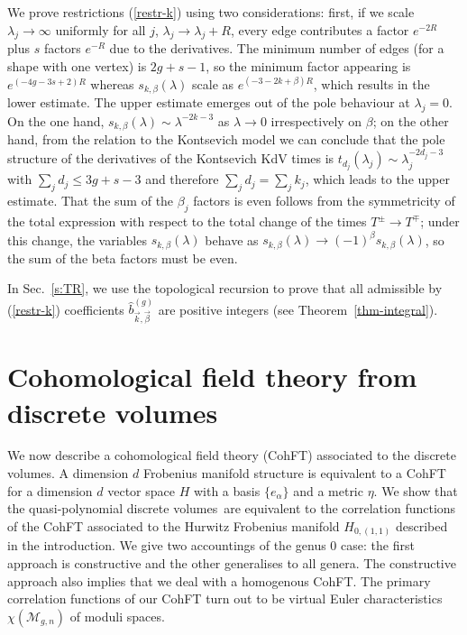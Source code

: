 \documentclass[11pt]{article}
\newcommand{\modm}{\mathcal{M}}
\theoremstyle{plain}
\theoremstyle{definition}
\newcommand {\dvol}{discrete volumes}%
\begin{document}
We prove restrictions (\ref{restr-k}) using two considerations: first, if we scale $\lambda_j\to \infty$ uniformly for
all $j$, $\lambda_j\to \lambda_j+R$, every edge contributes a factor $e^{-2R}$ plus $s$ factors
$e^{-R}$ due to the derivatives. The minimum number of edges (for a shape with one vertex) is $2g+s-1$, so the minimum
factor appearing is $e^{(-4g-3s+2)R}$ whereas $s_{k,\beta}(\lambda)$ scale as $e^{(-3-2k+\beta)R}$, which results
in the lower estimate. The upper estimate emerges out of the pole behaviour at $\lambda_j = 0$. On the one hand, $s_{k,\beta}(\lambda)\sim \lambda^{-2k-3}$ as $\lambda\to 0$ irrespectively on $\beta$; on the other hand,
from the relation to the Kontsevich model we can conclude that the pole structure of the derivatives of the Kontsevich KdV times is $t_{d_j}(\lambda_j)\sim \lambda_j^{-2d_j-3}$ with $\sum_j d_j\le 3g+s-3$ and therefore
$\sum_j d_j=\sum_j k_j$, which leads to the upper estimate. That the sum of the $\beta_j$ factors is even follows from
the symmetricity of the total expression with respect to the total change of the times $T^{\pm}\to T^{\mp}$; under this change,
the variables $s_{k,\beta}(\lambda)$ behave as $s_{k,\beta}(\lambda)\to (-1)^\beta s_{k,\beta}(\lambda)$,
so the sum of the beta factors must be even.

In Sec.~\ref{s:TR}, we use the topological recursion to prove that all admissible by (\ref{restr-k}) coefficients
$\widehat b^{(g)}_{\vec k,\vec \beta}$ are positive integers (see Theorem~\ref{thm-integral}).

\section{Cohomological field theory from \dvol}\label{s:CohFT}
\setcounter{equation}{0}

We now describe a cohomological field theory (CohFT) associated to the \dvol.  A dimension $d$ Frobenius manifold structure is equivalent to a CohFT  for a dimension $d$ vector space $H$ with a basis $\{e_{\alpha}\}$ and a metric $\eta$.  We show that the quasi-polynomial \dvol\  are equivalent to the correlation functions of the CohFT associated to the Hurwitz Frobenius manifold $H_{0,(1,1)}$ described in the introduction.  We give two accountings of the genus 0 case: the first approach is constructive and the other generalises to all genera.  The constructive approach also implies that we deal with a homogenous CohFT.  The primary correlation functions of our CohFT turn out to be virtual Euler characteristics 
$\chi(\modm_{g,n})$ of moduli spaces.
\end{document}
